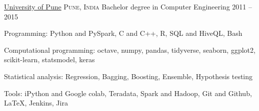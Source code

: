 \documentclass[10pt,a4paper]{article}
\begin{document}
\spacedhrule{0.9em}{-0.4em}




\headedsection
  {\href{}{University of Pune}}
  {\textsc{Pune, India}} {%
  \headedsubsection
    {Bachelor degree in Computer Engineering}
    {2011 -- 2015}
    {}
}

\spacedhrule{0.9em}{-0.4em}



\inlineheadsection  %
 {Programming:}
{Python and PySpark, C and C++, R, SQL and HiveQL, Bash}
\vspace{0.5em}

\inlineheadsection
 {Computational programming:}
{octave, numpy, pandas, tidyverse, seaborn, ggplot2, scikit-learn, statsmodel, keras}
\vspace{0.5em}

\inlineheadsection
 {Statistical analysis:}
{Regression, Bagging, Boosting, Ensemble, Hypothesis testing}
\vspace{0.5em}

\inlineheadsection
  {Tools:}
  {iPython and Google colab, Teradata, Spark and Hadoop, Git and Github, \LaTeX, Jenkins, Jira}
\end{document}
